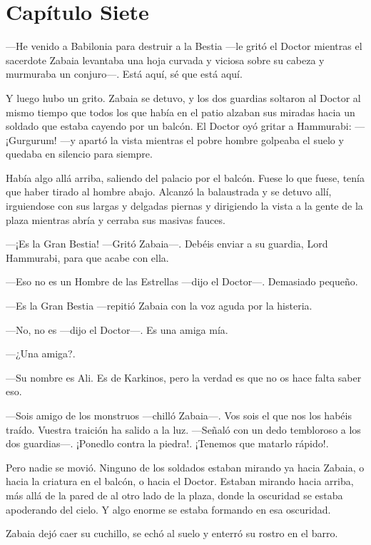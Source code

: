 \chapter*{Capítulo Siete}


---He venido a Babilonia para destruir a la Bestia ---le gritó el Doctor
mientras el sacerdote Zabaia levantaba una hoja curvada y viciosa sobre
su cabeza y murmuraba un conjuro---. Está aquí, sé que está aquí.

Y luego hubo un grito. Zabaia se detuvo, y los dos guardias soltaron al
Doctor al mismo tiempo que todos los que había en el patio alzaban sus
miradas hacia un soldado que estaba cayendo por un balcón. El Doctor oyó
gritar a Hammurabi: ---¡Gurgurum! ---y apartó la vista mientras el pobre
hombre golpeaba el suelo y quedaba en silencio para siempre.

Había algo allá arriba, saliendo del palacio por el balcón. Fuese lo que
fuese, tenía que haber tirado al hombre abajo. Alcanzó la balaustrada y
se detuvo allí, irguiendose con sus largas y delgadas piernas y
dirigiendo la vista a la gente de la plaza mientras abría y cerraba sus
masivas fauces.

---¡Es la Gran Bestia! ---Gritó Zabaia---. Debéis enviar a su guardia,
Lord Hammurabi, para que acabe con ella.

---Eso no es un Hombre de las Estrellas ---dijo el Doctor---. Demasiado
pequeño.

---Es la Gran Bestia ---repitió Zabaia con la voz aguda por la histeria.

---No, no es ---dijo el Doctor---. Es una amiga mía.

---¿Una amiga?.

---Su nombre es Ali. Es de Karkinos, pero la verdad es que no os hace
falta saber eso.

---Sois amigo de los monstruos ---chilló Zabaia---. Vos sois el que nos
los habéis traído. Vuestra traición ha salido a la luz. ---Señaló con un
dedo tembloroso a los dos guardias---. ¡Ponedlo contra la piedra!.
¡Tenemos que matarlo rápido!.

Pero nadie se movió. Ninguno de los soldados estaban mirando ya hacia
Zabaia, o hacia la criatura en el balcón, o hacia el Doctor. Estaban
mirando hacia arriba, más allá de la pared de al otro lado de la plaza,
donde la oscuridad se estaba apoderando del cielo. Y algo enorme se
estaba formando en esa oscuridad.

Zabaia dejó caer su cuchillo, se echó al suelo y enterró su rostro en el
barro.

